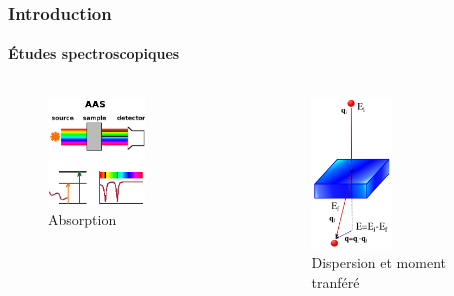 \documentclass[french]{beamer}
\begin{document}
\begin{frame}
\frametitle{Introduction}
\framesubtitle{Études spectroscopiques}
\begin{columns}
  \begin{column}{0.5\textwidth}
    \begin{figure}[!h]
    \centering
    \includegraphics[width=0.6\textwidth]{absorption}
    \vspace{3em}
    \caption{Absorption}
    \end{figure}
  \end{column}
  \begin{column}{0.5\textwidth}
    \begin{figure}[!h]
    \centering
    \includegraphics[width=0.5\textwidth]{eels}
    \caption{Dispersion et moment tranféré}
    \end{figure}
  \end{column}
\end{columns}
\end{frame}
\newpage
\end{document}
